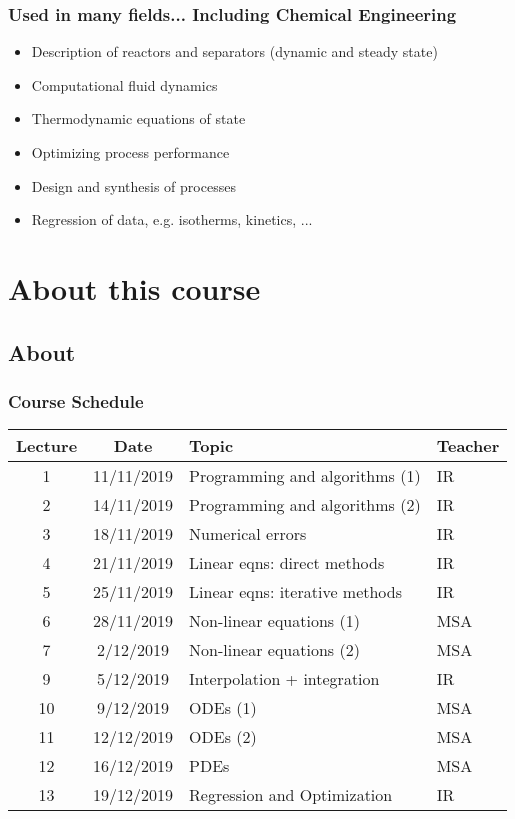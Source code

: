 \begin{frame}
 \frametitle{Used in many fields... Including Chemical Engineering}
  \begin{itemize}
	  \item Description of reactors and separators (dynamic and steady state)
		\item Computational fluid dynamics
		\item Thermodynamic equations of state
		\item Optimizing process performance
		\item Design and synthesis of processes
		\item Regression of data, e.g. isotherms, kinetics, ...
 \end{itemize}
\end{frame}

\section{About this course}
\subsection{About}
\begin{frame}
 \frametitle{Course Schedule}
 \centering
 \begin{tabular}{ccll}
 \hline
 Lecture & Date & Topic & Teacher \\ 
 \hline
 1 & 11/11/2019 & Programming and algorithms (1) & IR \\ 
 2 & 14/11/2019 & Programming and algorithms (2) & IR \\ 
 3 & 18/11/2019 & Numerical errors & IR \\ 
 4 & 21/11/2019 & Linear eqns: direct methods & IR\\ 
 5 & 25/11/2019 & Linear eqns: iterative methods & IR \\ 
 6 & 28/11/2019 & Non-linear equations (1) & MSA \\ 
 7 & 2/12/2019 & Non-linear equations (2) & MSA\\ 
 9 & 5/12/2019 & Interpolation + integration & IR \\ 
 10 & 9/12/2019 & ODEs (1) & MSA \\
 11 & 12/12/2019 & ODEs (2) & MSA \\ 
 12 & 16/12/2019 & PDEs & MSA \\ 
 13 & 19/12/2019 & Regression and Optimization & IR \\ 
 \hline
 \end{tabular} 
\end{frame}

